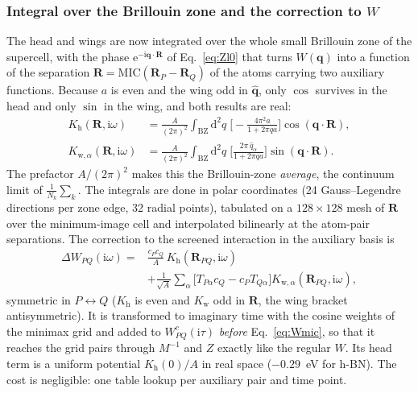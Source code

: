\documentclass[%
 reprint,
superscriptaddress,
 amsmath,amssymb,
 aps,
prb,
]{revtex4-2}
\newcommand{\bR}{\mathbf{R}}
\newcommand{\bq}{\mathbf{q}}
\newcommand{\qhat}{\hat{\mathbf{q}}}
\newcommand{\dd}{\mathrm{d}}
\newcommand{\ii}{\mathrm{i}}
\newcommand{\ee}{\mathrm{e}}
\newcommand{\MIC}{\mathrm{MIC}}
\newcommand{\head}{\mathrm{h}}
\newcommand{\wing}{\mathrm{w}}
\begin{document}
\subsubsection{Integral over the Brillouin zone and the correction to $W$}
\label{sec:DeltaW}

The head and wings are now integrated over the whole small Brillouin zone of the supercell,
with the phase $\ee^{-\ii\bq\cdot\bR}$ of Eq.~\eqref{eq:Zl0} that turns $W(\bq)$ into a
function of the separation $\bR = \MIC(\bR_P-\bR_Q)$ of the atoms carrying two auxiliary
functions. Because $a$ is even and the wing odd in
$\qhat$, only $\cos$ survives in the head and only $\sin$ in the wing, and both results are
real:
\begin{align}
  K_\head(\bR,\ii\omega) &= \frac{A}{(2\pi)^2}\int_{\mathrm{BZ}}\dd^2 q\;
  \Big[-\frac{4\pi^2 a}{1+2\pi q a}\Big]\cos(\bq\cdot\bR),
  \label{eq:Kh}\\
  K_{\wing,\alpha}(\bR,\ii\omega) &= \frac{A}{(2\pi)^2}\int_{\mathrm{BZ}}\dd^2 q\;
  \Big[\frac{2\pi\,\hat q_\alpha}{1+2\pi q a}\Big]\sin(\bq\cdot\bR).
  \label{eq:Kw}
\end{align}
The prefactor $A/(2\pi)^2$ makes this the Brillouin-zone \emph{average}, the continuum limit of
$\frac1{N_k}\sum_k$. The integrals are done in polar coordinates (24 Gauss--Legendre directions
per zone edge, 32 radial points), tabulated on a $128\times128$ mesh of $\bR$ over the
minimum-image cell and interpolated bilinearly at the atom-pair separations. The correction
to the screened interaction in the auxiliary basis is
\begin{equation}
\begin{aligned}
  \Delta W_{PQ}(\ii\omega) ={}& \frac{c_P c_Q}{A}\,K_\head(\bR_{PQ},\ii\omega)\\
  &+ \frac{1}{\sqrt A}\sum_\alpha\big[T_{P\alpha}c_Q - c_P T_{Q\alpha}\big]
  K_{\wing,\alpha}(\bR_{PQ},\ii\omega),
\end{aligned}
  \label{eq:DeltaW}
\end{equation}
symmetric in $P\leftrightarrow Q$ ($K_\head$ is even and $K_\wing$ odd in $\bR$, the wing
bracket antisymmetric). It is transformed to imaginary time with the cosine weights of the
minimax grid and added to $W^c_{PQ}(\ii\tau)$ \emph{before} Eq.~\eqref{eq:Wmic}, so that it
reaches the grid pairs through $M^{-1}$ and $Z$ exactly like the regular $W$. Its head term
is a uniform potential $K_\head(0)/A$ in real space ($-0.29$~eV for h-BN). The cost is
negligible: one table lookup per auxiliary pair and time point.
\end{document}

